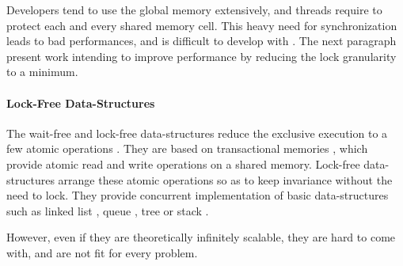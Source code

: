 
Developers tend to use the global memory extensively, and threads require to protect each and every shared memory cell.
This heavy need for synchronization leads to bad performances, and is difficult to develop with \cite{Adya2002}.
The next paragraph present work intending to improve performance by reducing the lock granularity to a minimum.


\paragraph{Lock-Free Data-Structures}

The wait-free and lock-free data-structures reduce the exclusive execution to a few atomic operations \cite{Lamport1977,Herlihy1988,Herlihy1990,Herlihy1991,Anderson1990}.
They are based on transactional memories \cite{Harris2010}, which provide atomic read and write operations on a shared memory.
Lock-free data-structures arrange these atomic operations so as to keep invariance without the need to lock.
They provide concurrent implementation of basic data-structures such as linked list \cite{Valois1995,Timnat2012}, queue \cite{Sundell2003,Wimmer2015}, tree \cite{Ramachandran2015} or stack \cite{Hendler2004}.

However, even if they are theoretically infinitely scalable, they are hard to come with, and are not fit for every problem.






